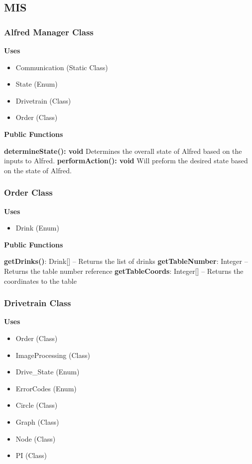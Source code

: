\documentclass [10pt]{article}
\begin{document}
\subsection{MIS}

\subsubsection{Alfred Manager Class}

\textbf{Uses}
\begin{itemize}
	\item Communication (Static Class)
	\item State (Enum)
	\item Drivetrain (Class)
	\item Order (Class)
\end{itemize}



\textbf{Public Functions}

\textbf{determineState(): void}
Determines the overall state of Alfred based on the inputs to Alfred.
\textbf{performAction(): void}
Will preform the desired state based on the state of Alfred.

\subsubsection{Order Class}
\textbf{Uses}
\begin{itemize}
	\item Drink (Enum)
\end{itemize}


\textbf{Public Functions}

\textbf{getDrinks()}: Drink[] – Returns the list of drinks
\textbf{getTableNumber}: Integer – Returns the table number reference
\textbf{getTableCoords}: Integer[] – Returns the coordinates to the table

\subsubsection{Drivetrain Class}
\textbf{Uses}
\begin{itemize}
	\item Order (Class)
	\item ImageProcessing (Class)
	\item Drive\_State (Enum)
	\item ErrorCodes (Enum)
	\item Circle (Class)
	\item Graph (Class)
	\item Node (Class)
	\item PI (Class)
\end{itemize}
\end{document}

